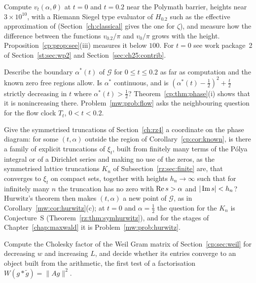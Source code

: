 \begin{problem}\label{cp:prob:high}
Compute $v_t(\alpha,\theta)$ at $t=0$ and $t=0.2$ near the Polymath barrier, heights near $3\times10^{10}$, with a Riemann Siegel type evaluator of $H_{0.2}$ such as the effective approximation of \cite{Polymath} (Section~\ref{ch:classical} gives the one for $\zeta$), and measure how the difference between the functions $v_{0.2}/\pi$ and $v_0/\pi$ grows with the height. Proposition~\ref{cp:prop:see}(iii) measures it below $100$. For $t=0$ see work package~2 of Section~\ref{st:sec:wp2} and Section~\ref{sec:ch25:contrib}.
\end{problem}

\begin{problem}\label{cp:prob:boundary}
Describe the boundary $\alpha^*(t)$ of $\mathcal G$ for $0\le t\le0.2$ as far as computation and the known zero free regions allow. Is $\alpha^*$ continuous, and is $(\alpha^*(t)-\frac12)^2+\frac t2$ strictly decreasing in $t$ where $\alpha^*(t)>\frac12$? Theorem~\ref{cp:thm:phase}(i) shows that it is nonincreasing there. Problem~\ref{mw:prob:flow} asks the neighbouring question for the flow clock $T_t$, $0<t<0.2$.
\end{problem}

\begin{problem}\label{cp:prob:trunc}
Give the symmetrised truncations of Section~\ref{ch:rz4} a coordinate on the phase diagram: for some $(t,\alpha)$ outside the region of Corollary~\ref{cp:cor:known}, is there a family of explicit truncations of $\xi_t$, built from finitely many terms of the P\'olya integral or of a Dirichlet series and making no use of the zeros, as the symmetrised lattice truncations $K_n$ of Subsection~\ref{rz:sec:finite} are, that converges to $\xi_t$ on compact sets, together with heights $h_n\to\infty$ such that for infinitely many $n$ the truncation has no zero with $\operatorname{Re} s>\alpha$ and $|\operatorname{Im} s|<h_n$? Hurwitz's theorem then makes $(t,\alpha)$ a new point of $\mathcal G$, as in Corollary~\ref{mw:cor:hurwitz}(c); at $t=0$ and $\alpha=\frac12$ the question for the $K_n$ is Conjecture~S (Theorem~\ref{rz:thm:symhurwitz}), and for the stages of Chapter~\ref{chap:maxwald} it is Problem~\ref{mw:prob:hurwitz}.
\end{problem}

\begin{problem}\label{cp:prob:chol}
Compute the Cholesky factor of the Weil Gram matrix of Section~\ref{cp:sec:weil} for decreasing $w$ and increasing $L$, and decide whether its entries converge to an object built from the arithmetic, the first test of a factorisation $W(g*\tilde g)=\|Ag\|^2$.
\end{problem}

